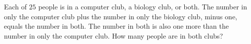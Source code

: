 Each of $25$ people is in a computer club, a biology club, or both. The number in only the computer club plus the number in only the biology club, minus one, equals the number in both. The number in both is also one more than the number in only the computer club. How many people are in both clubs?
